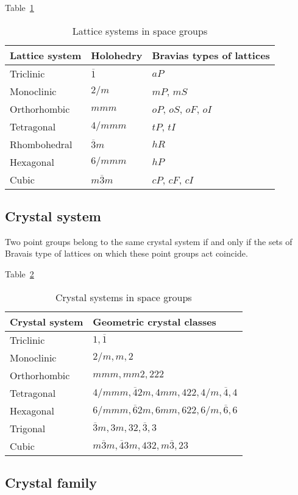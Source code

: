 
Table~\ref{tab:lattice_system}

\begin{table}[tb]
  \centering
  \caption{Lattice systems in space groups}
  \label{tab:lattice_system}
  \begin{tabular}[h]{lll}
    \hline
    Lattice system & Holohedry & Bravias types of lattices \\ \hline
    Triclinic    & $\overline{1}$   & $aP$                   \\
    Monoclinic   & $2/m$            & $mP$, $mS$             \\
    Orthorhombic & $mmm$            & $oP$, $oS$, $oF$, $oI$ \\
    Tetragonal   & $4/mmm$          & $tP$, $tI$             \\
    Rhombohedral & $\overline{3}m$  & $hR$                   \\
    Hexagonal    & $6/mmm$          & $hP$                   \\
    Cubic        & $m\overline{3}m$ & $cP$, $cF$, $cI$       \\ \hline
  \end{tabular}
\end{table}

\subsection{\label{sec:crystal-system}Crystal system}

\todo{}

Two point groups belong to the same crystal system if and only if the sets of Bravais type of lattices on which these point groups act coincide.

Table~\ref{tab:crystal_system}

\begin{table}[tb]
  \centering
  \caption{Crystal systems in space groups}
  \label{tab:crystal_system}
  \begin{tabular}{ll}
    \hline
    Crystal system & Geometric crystal classes                                \\ \hline
    Triclinic      & $1, \overline{1}$                                        \\
    Monoclinic     & $2/m, m, 2$                                              \\
    Orthorhombic   & $mmm, mm2, 222$                                          \\
    Tetragonal     & $4/mmm, \overline{4}2m, 4mm, 422, 4/m, \overline{4}, 4$  \\
    Hexagonal      & $6/mmm, \overline{6}2m, 6mm, 622, 6/m, \overline{6}, 6$  \\
    Trigonal       & $\overline{3}m, 3m, 32, \overline{3}, 3$                 \\
    Cubic          & $m\overline{3}m, \overline{4}3m, 432, m\overline{3}, 23$ \\ \hline
  \end{tabular}
\end{table}

\subsection{\label{sec:crystal-family}Crystal family}
